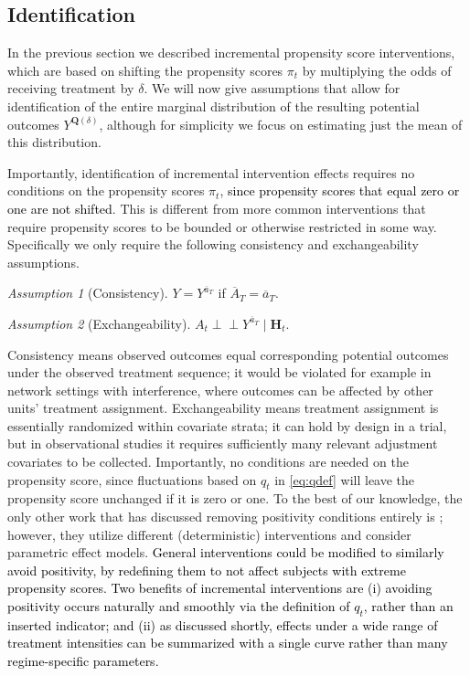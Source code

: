 \documentclass[12pt]{article}
\def\ind{\perp\!\!\!\perp}
\newcommand{\bH}{\mathbf{H}}
\newcommand{\bQ}{\mathbf{Q}}
\theoremstyle{remark}
\newtheorem{assumption}{Assumption}
\begin{document}
\subsection{Identification}
\label{sec:ident}

In the previous section we described incremental propensity score interventions, which are based on shifting the propensity scores $\pi_t$ by multiplying the odds of receiving treatment by $\delta$. We will now give assumptions that allow for identification of the entire marginal distribution of the resulting potential outcomes $Y^{\bQ(\delta)}$, although for simplicity we focus on estimating just the mean of this distribution.

Importantly, identification of incremental intervention effects requires no conditions on the propensity scores $\pi_t$, \textcolor{black}{since propensity scores that equal zero or one are not shifted}. This is different from more common interventions that require propensity scores to be bounded or otherwise restricted in some way. Specifically we only require the following consistency and exchangeability assumptions.

\begin{assumption}[Consistency]
$Y=Y^{\overline{a}_T}$ if $\overline{A}_T = \overline{a}_T$.
\end{assumption}
\begin{assumption}[Exchangeability]
$A_t \ind Y^{\overline{a}_T} \mid \bH_t$.
\end{assumption}

Consistency means observed outcomes equal corresponding potential outcomes under the observed treatment sequence; it would be violated for example in network settings with interference, where outcomes can be affected by other units' treatment assignment. Exchangeability means treatment assignment is essentially randomized within covariate strata; it can hold by design in a trial, but in observational studies it requires sufficiently many relevant adjustment covariates to be collected.  Importantly, no conditions are needed on the propensity score, since fluctuations based on $q_t$ in \eqref{eq:qdef} will leave the propensity score unchanged if it is zero or one. To the best of our knowledge, the only other work that has discussed removing positivity conditions entirely is \textcite{van2007causal,moore2012causal}; however, they utilize different (deterministic) interventions and consider parametric effect models. \textcolor{black}{General interventions could be modified to similarly avoid positivity, by redefining them to not affect subjects with extreme propensity scores. Two benefits of incremental interventions are (i) avoiding positivity occurs naturally and smoothly via the definition of $q_t$, rather than an inserted indicator; and (ii) as discussed shortly, effects under a wide range of treatment intensities can be summarized with a single curve rather than many regime-specific parameters.}
\end{document}
